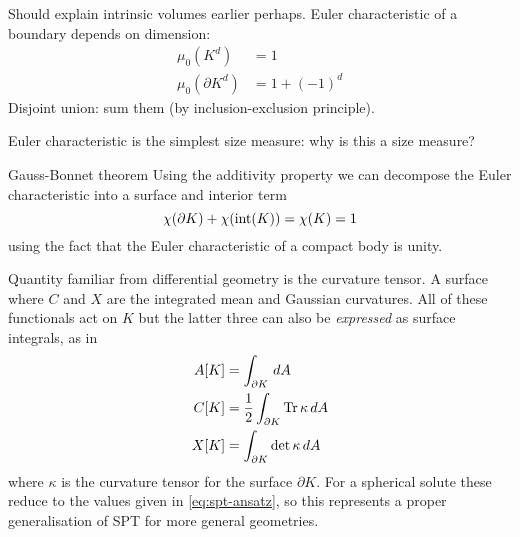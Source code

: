 Should explain intrinsic volumes earlier perhaps.
Euler characteristic of a boundary depends on dimension:
\begin{align}
  \mu_0(K^d) &= 1 \\
  \mu_0(\partial K^d) &= 1 + (-1)^d
\end{align}
Disjoint union: sum them (by inclusion-exclusion principle).

Euler characteristic is the simplest size measure: why is this a size measure?

\begin{theorem}{Gauss-Bonnet theorem}
  Using the additivity property we can decompose the Euler characteristic into a surface and interior term
  \begin{equation*}
    \chi(\partial K) + \chi( \operatorname{int}(K) ) = \chi(K) = 1
  \end{equation*}
  using the fact that the Euler characteristic of a compact body is unity.
\end{theorem}

Quantity familiar from differential geometry is the curvature tensor.
A surface
where $C$ and $X$ are the integrated mean and Gaussian curvatures.
All of these functionals act on $K$ but the latter three can also be \emph{expressed} as surface integrals, as in
\begin{subequations}\label{eq:intrinsic-volumes-surface-integrals}
  \begin{align}
    A[K]
    &=
    \int_{\partial K} \, dA
    \\
    C[K]
    &=
    \frac{1}{2} \int_{\partial K} \operatorname*{Tr}{\kappa} \, dA
    \\
    X[K]
    &=
    \int_{\partial K} \det{\kappa} \, dA
  \end{align}
\end{subequations}
where $\kappa$ is the curvature tensor for the surface $\partial K$.
For a spherical solute these reduce to the values given in \eqref{eq:spt-ansatz}, so this represents a proper generalisation of SPT for more general geometries.

